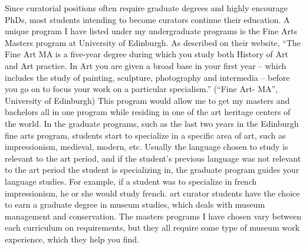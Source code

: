 	Since curatorial positions often require graduate degrees and highly encourage PhDs, most students intending to become curators continue their education. A unique program I have listed under my undergraduate programs is the Fine Arts Masters program at University of Edinburgh. As described on their website, “The Fine Art MA is a five-year degree during which you study both History of Art and Art practice. In Art you are given a broad base in your first year – which includes the study of painting, sculpture, photography and intermedia – before you go on to focus your work on a particular specialism.” (“Fine Art- MA”, University of Edinburgh) This program would allow me to get my masters and bachelors all in one program while residing in one of the art heritage centers of the world. In the graduate programs, such as the last two years in the Edinburgh fine arts program, students start to specialize in a specific area of art, such as impressionism, medieval, modern, etc. Usually the language chosen to study is relevant to the art period, and if the student’s previous language was not relevant to the art period the student is specializing in, the graduate program guides your language studies. For example, if a student was to specialize in french impressionism, he or she would study french. art curator students have the choice to earn a graduate degree in museum studies, which deals with museum management and conservation. The masters programs I have chosen vary between each curriculum on requirements, but they all require some type of museum work experience, which they help you find. 

